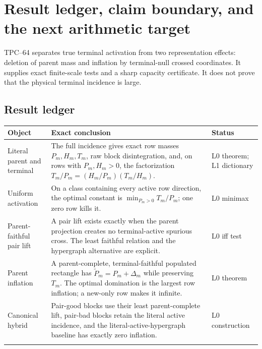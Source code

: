 \section{Result ledger, claim boundary, and the next arithmetic target}
\label{sec:tpc64-claim-boundary}

TPC--64 separates true terminal activation from two representation
effects: deletion of parent mass and inflation by terminal-null crossed
coordinates.  It supplies exact finite-scale tests and a sharp capacity
certificate.  It does not prove that the physical terminal incidence is
large.

\subsection{Result ledger}

\begin{center}
\small
\begin{tabular}{>{\raggedright\arraybackslash}p{}
                >{\raggedright\arraybackslash}p{}
                >{\raggedright\arraybackslash}p{}}
\toprule
Object & Exact conclusion & Status\\
\midrule
Literal parent and terminal
& The full incidence gives exact row masses \(P_m,H_m,T_m\), raw block
  disintegration, and, on rows with \(P_m,H_m>0\), the factorization
  \(T_m/P_m=(H_m/P_m)(T_m/H_m)\).
& L0 theorem; L1 dictionary\\
\addlinespace
Uniform activation
& On a class containing every active row direction, the optimal constant
  is \(\min_{P_m>0}T_m/P_m\); one zero row kills it.
& L0 minimax\\
\addlinespace
Parent-faithful pair lift
& A pair lift exists exactly when the parent projection creates no
  terminal-active spurious cross.  The least faithful relation and the
  hypergraph alternative are explicit.
& L0 iff test\\
\addlinespace
Parent inflation
& A parent-complete, terminal-faithful populated rectangle has
  \(\widetilde P_m=P_m+\Delta_m\) while preserving \(T_m\).  The optimal
  domination is the largest row inflation; a new-only row makes it
  infinite.
& L0 theorem\\
\addlinespace
Canonical hybrid
& Pair-good blocks use their least parent-complete lift, pair-bad blocks
  retain the literal active incidence, and the literal-active-hypergraph baseline has
  exactly zero inflation.
& L0 construction\\
\addlinespace

\end{tabular}
\end{center}
